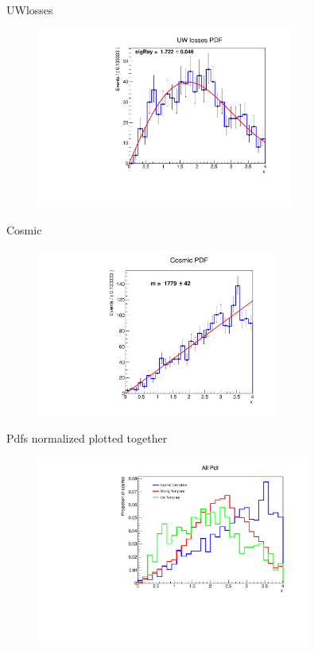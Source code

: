 \documentclass[10pt]{beamer}
\begin{document}
\begin{frame}{UWlosses}

\begin{figure}
\includegraphics[width = 0.75\textwidth]{FitToUW.pdf}
\end{figure}

\end{frame}

\begin{frame}{Cosmic}

\begin{figure}
\includegraphics[width = 0.7\textwidth]{Cosmici_fit.pdf}
\end{figure}

\end{frame}

\begin{frame}{Pdfs normalized plotted together}
\begin{figure}
\includegraphics[width = 0.80\textwidth]{PdfTogether.pdf}
\end{figure}
\end{frame}
\end{document}
